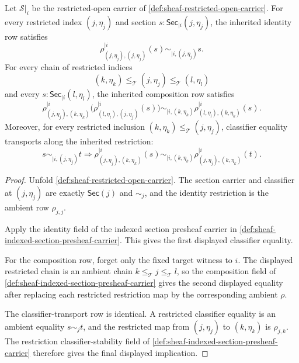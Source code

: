 \begin{theorem}
\label{thm:sheaf-restricted-open-restriction-laws}
Let $\mathcal{S}|_i$ be the restricted-open carrier of \autoref{def:sheaf-restricted-open-carrier}. For every restricted index $(j,\eta_j)$ and section $s:\mathsf{Sec}_{|i}(j,\eta_j)$, the inherited identity row satisfies
$$
\rho^{|i}_{(j,\eta_j),(j,\eta_j)}(s)\sim_{|i,(j,\eta_j)}s.
$$
For every chain of restricted indices
$$
(k,\eta_k)\le_{\mathcal{T}}(j,\eta_j)\le_{\mathcal{T}}(l,\eta_l)
$$
and every $s:\mathsf{Sec}_{|i}(l,\eta_l)$, the inherited composition row satisfies
$$
\rho^{|i}_{(j,\eta_j),(k,\eta_k)}
\bigl(\rho^{|i}_{(l,\eta_l),(j,\eta_j)}(s)\bigr)
\sim_{|i,(k,\eta_k)}
\rho^{|i}_{(l,\eta_l),(k,\eta_k)}(s).
$$
Moreover, for every restricted inclusion $(k,\eta_k)\le_{\mathcal{T}}(j,\eta_j)$, classifier equality transports along the inherited restriction:
$$
s\sim_{|i,(j,\eta_j)}t
\Longrightarrow
\rho^{|i}_{(j,\eta_j),(k,\eta_k)}(s)
\sim_{|i,(k,\eta_k)}
\rho^{|i}_{(j,\eta_j),(k,\eta_k)}(t).
$$
\end{theorem}
\begin{proof}
Unfold \autoref{def:sheaf-restricted-open-carrier}. The section carrier and classifier at $(j,\eta_j)$ are exactly $\mathsf{Sec}(j)$ and $\sim_j$, and the identity restriction is the ambient row $\rho_{j,j}$.

Apply the identity field of the indexed section presheaf carrier in \autoref{def:sheaf-indexed-section-presheaf-carrier}. This gives the first displayed classifier equality.

For the composition row, forget only the fixed target witness to $i$. The displayed restricted chain is an ambient chain $k\le_{\mathcal{T}}j\le_{\mathcal{T}}l$, so the composition field of \autoref{def:sheaf-indexed-section-presheaf-carrier} gives the second displayed equality after replacing each restricted restriction map by the corresponding ambient $\rho$.

The classifier-transport row is identical. A restricted classifier equality is an ambient equality $s\sim_j t$, and the restricted map from $(j,\eta_j)$ to $(k,\eta_k)$ is $\rho_{j,k}$. The restriction classifier-stability field of \autoref{def:sheaf-indexed-section-presheaf-carrier} therefore gives the final displayed implication.
\end{proof}

